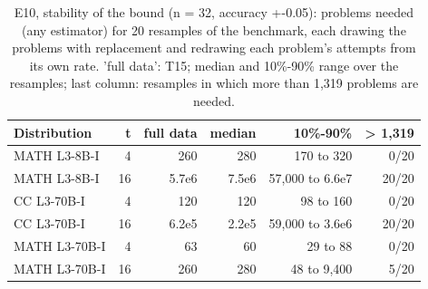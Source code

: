 \begin{table}[t]
\centering
\small
\begin{tabular}{lrrrrr}
\toprule
Distribution & t & full data & median & 10\%-90\% & > 1,319 \\
\midrule
MATH L3-8B-I & 4 & 260 & 280 & 170 to 320 & 0/20 \\
MATH L3-8B-I & 16 & 5.7e6 & 7.5e6 & 57,000 to 6.6e7 & 20/20 \\
CC L3-70B-I & 4 & 120 & 120 & 98 to 160 & 0/20 \\
CC L3-70B-I & 16 & 6.2e5 & 2.2e5 & 59,000 to 3.6e6 & 20/20 \\
MATH L3-70B-I & 4 & 63 & 60 & 29 to 88 & 0/20 \\
MATH L3-70B-I & 16 & 260 & 280 & 48 to 9,400 & 5/20 \\
\bottomrule
\end{tabular}
\caption{E10, stability of the bound (n = 32, accuracy +-0.05): problems needed (any estimator) for 20 resamples of the benchmark, each drawing the problems with replacement and redrawing each problem's attempts from its own rate. 'full data': T15; median and 10\%-90\% range over the resamples; last column: resamples in which more than 1,319 problems are needed.}
\label{tab:T18_bound_under_resampling}
\end{table}
